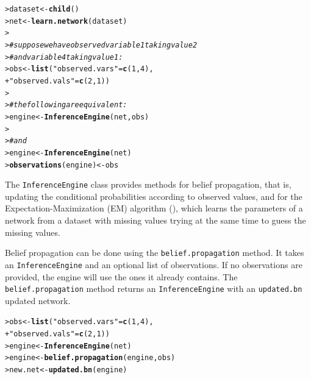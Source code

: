 \documentclass{article}\usepackage[]{graphicx}\usepackage[]{color}
\makeatletter
\newcommand{\hlnum}[1]{\textcolor[rgb]{0.686,0.059,0.569}{#1}}%
\newcommand{\hlstr}[1]{\textcolor[rgb]{0.192,0.494,0.8}{#1}}%
\newcommand{\hlcom}[1]{\textcolor[rgb]{0.678,0.584,0.686}{\textit{#1}}}%
\newcommand{\hlstd}[1]{\textcolor[rgb]{0.345,0.345,0.345}{#1}}%
\newcommand{\hlkwb}[1]{\textcolor[rgb]{0.69,0.353,0.396}{#1}}%
\newcommand{\hlkwd}[1]{\textcolor[rgb]{0.737,0.353,0.396}{\textbf{#1}}}%
\newenvironment{kframe}{%
 \def\at@end@of@kframe{}%
 \ifinner\ifhmode%
  \def\at@end@of@kframe{\end{minipage}}%
  \begin{minipage}{\columnwidth}%
 \fi\fi%
 \def\FrameCommand##1{\hskip\@totalleftmargin \hskip-\fboxsep
 \colorbox{shadecolor}{##1}\hskip-\fboxsep
     \hskip-\linewidth \hskip-\@totalleftmargin \hskip\columnwidth}%
 \MakeFramed {\advance\hsize-\width
   \@totalleftmargin\z@ \linewidth\hsize
   \@setminipage}}%
 {\par\unskip\endMakeFramed%
 \at@end@of@kframe}
\newenvironment{knitrout}{}{} %
\newcommand{\Robject}[1]{{\texttt{#1}}}
\newcommand{\Rmethod}[1]{{\texttt{#1}}}
\makeatother
\begin{document}
\begin{knitrout}
\color{fgcolor}\begin{kframe}
\begin{alltt}
\hlstd{> }\hlstd{dataset} \hlkwb{<-} \hlkwd{child}\hlstd{()}
\hlstd{> }\hlstd{net}     \hlkwb{<-} \hlkwd{learn.network}\hlstd{(dataset)}
\hlstd{> }
\hlstd{> }\hlcom{# suppose we have observed variable 1 taking value 2}
\hlstd{> }\hlcom{# and variable 4 taking value 1:}
\hlstd{> }\hlstd{obs} \hlkwb{<-} \hlkwd{list}\hlstd{(}\hlstr{"observed.vars"} \hlstd{=} \hlkwd{c}\hlstd{(}\hlnum{1}\hlstd{,}\hlnum{4}\hlstd{),}
\hlstd{+ }            \hlstr{"observed.vals"} \hlstd{=} \hlkwd{c}\hlstd{(}\hlnum{2}\hlstd{,}\hlnum{1}\hlstd{))}
\hlstd{> }
\hlstd{> }\hlcom{# the following are equivalent:}
\hlstd{> }\hlstd{engine}  \hlkwb{<-} \hlkwd{InferenceEngine}\hlstd{(net, obs)}
\hlstd{> }
\hlstd{> }\hlcom{# and}
\hlstd{> }\hlstd{engine}  \hlkwb{<-} \hlkwd{InferenceEngine}\hlstd{(net)}
\hlstd{> }\hlkwd{observations}\hlstd{(engine)} \hlkwb{<-} \hlstd{obs}
\end{alltt}
\end{kframe}
\end{knitrout}

The \Robject{InferenceEngine} class provides methods for belief propagation, that is, updating
the conditional probabilities according to observed values, and for the Expectation-Maximization (EM) algorithm
(\cite{dempster1977maximum}), which learns the parameters of a network from a dataset with missing values trying
at the same time to guess the missing values.

Belief propagation can be done using the \Rmethod{belief.propagation} method. It takes an \Robject{InferenceEngine}
and an optional list of observations. If no observations are provided, the engine will use the ones it already contains.
The \Rmethod{belief.propagation} method returns an \Robject{InferenceEngine} with an \Rmethod{updated.bn}
updated network.
\begin{knitrout}
\color{fgcolor}\begin{kframe}
\begin{alltt}
\hlstd{> }\hlstd{obs} \hlkwb{<-} \hlkwd{list}\hlstd{(}\hlstr{"observed.vars"} \hlstd{=} \hlkwd{c}\hlstd{(}\hlnum{1}\hlstd{,}\hlnum{4}\hlstd{),}
\hlstd{+ }            \hlstr{"observed.vals"} \hlstd{=} \hlkwd{c}\hlstd{(}\hlnum{2}\hlstd{,}\hlnum{1}\hlstd{))}
\hlstd{> }\hlstd{engine}  \hlkwb{<-} \hlkwd{InferenceEngine}\hlstd{(net)}
\hlstd{> }\hlstd{engine}  \hlkwb{<-} \hlkwd{belief.propagation}\hlstd{(engine, obs)}
\hlstd{> }\hlstd{new.net} \hlkwb{<-} \hlkwd{updated.bn}\hlstd{(engine)}
\end{alltt}
\end{kframe}
\end{knitrout}
\end{document}
